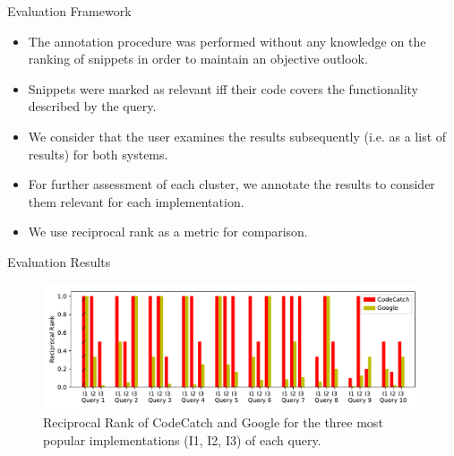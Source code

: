 \documentclass[compress]{beamer}
\begin{document}
\begin{frame}{Evaluation Framework}

\begin{itemize}

\item The annotation procedure was performed without any knowledge on the ranking of snippets in order to maintain an objective outlook.

\pause

\item Snippets were marked as {\Medium relevant} iff their code covers the functionality described by the query.

\pause
\item  We consider that the user examines the results subsequently (i.e. as a list of results) for both systems.

\pause
\item For further assessment of each cluster, we annotate the results to consider them relevant for each implementation.

\pause
\item We use {\Medium reciprocal rank} as a metric for comparison.

\end{itemize}

\end{frame}


\begin{frame}{Evaluation Results}

\begin{figure}
\includegraphics[width=\textwidth]{reciprocalrank}
\caption[]{Reciprocal Rank of CodeCatch and Google for the three most popular implementations (I1, I2, I3) of each query.}
\end{figure}



\end{frame}
\end{document}
